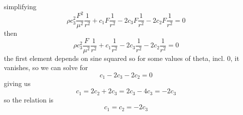 simplifying
\begin{equation}
    \rho c_3^2\frac{F^2}{\mu^2}\frac{1}{r^2}+c_1 F \frac{1}{r^2}-2c_3 F\frac{1}{r^2}-2c_2 F \frac{1}{r^2}=0
\end{equation}
then 
\begin{equation}
    \rho c_3^2\frac{F}{\mu^2}\frac{1}{r^2}+c_1 \frac{1}{r^2}-2c_3 \frac{1}{r^2}-2c_2  \frac{1}{r^2}=0
\end{equation}
the first element depends on sine squared so for some values of theta, incl. 0, it vanishes, so we can solve for 
\begin{equation}
    c_1 -2c_3 -2c_2=0
\end{equation}
giving us 
\begin{equation}
    c_1 = 2c_2+2c_3 = 2c_3 -4c_3=-2c_3
\end{equation}
so the relation is 
\begin{equation}
    c_1 = c_2 = -2c_3
\end{equation}